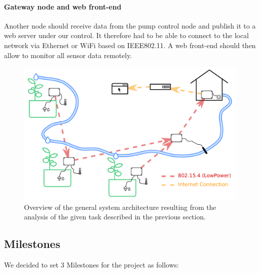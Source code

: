 \documentclass[11pt,paper=a4,parskip=half]{scrartcl}
\begin{document}
  \paragraph{Gateway node and web front-end} Another node should receive data
  from the pump control node and publish it to a web server under our control.
  It therefore had to be able to connect to the local network via Ethernet or
  WiFi based on IEEE802.11. A web front-end should then allow to monitor all
  sensor data remotely.

  \begin{figure}[h]
    \centering
    \includegraphics[scale=0.4]{schema}
	  \caption{Overview of the general system architecture resulting from
	  the analysis of the given task described in the previous section.}
    \label{fig:schema}
  \end{figure}

\subsection{Milestones}
  We decided to set 3 Milestones for the project as follows:
\end{document}
